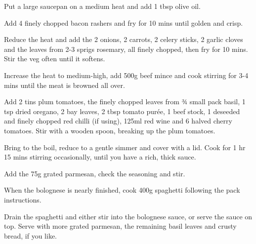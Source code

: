 \begin{method}
  	Put a large saucepan on a medium heat and add 1 tbsp olive oil.

Add 4 finely chopped bacon rashers and fry for 10 mins until golden
and crisp.

Reduce the heat and add the 2 onions, 2 carrots, 2 celery sticks, 2
garlic cloves and the leaves from 2-3 sprigs rosemary, all finely
chopped, then fry for 10 mins. Stir the veg often until it softens.

Increase the heat to medium-high, add 500g beef mince and cook
stirring for 3-4 mins until the meat is browned all over.

Add 2 tins plum tomatoes, the finely chopped leaves from ¾ small
pack basil, 1 tsp dried oregano, 2 bay leaves, 2 tbsp tomato purée, 1
beef stock, 1 deseeded and finely chopped red chilli (if using), 125ml
red wine and 6 halved cherry tomatoes. Stir with a wooden spoon,
breaking up the plum tomatoes.

Bring to the boil, reduce to a gentle simmer and cover with a lid. Cook
for 1 hr 15 mins stirring occasionally, until you have a rich, thick
sauce.

Add the 75g grated parmesan, check the seasoning and stir.

When the bolognese is nearly finished, cook 400g spaghetti following
the pack instructions.

Drain the spaghetti and either stir into the bolognese sauce, or serve
the sauce on top. Serve with more grated parmesan, the remaining
basil leaves and crusty bread, if you like.

  
\end{method}





